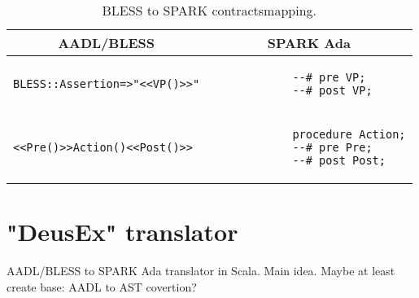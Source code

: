 \begin{table}[!ht]
	\caption{BLESS to SPARK contractsmapping.}
	\centering
  	\begin{tabular}{ | p{3in} | p{3in} |}

		\hline
		\multicolumn{1}{|c|}{\textbf{AADL/BLESS}} & \multicolumn{1}{|c|}{\textbf{SPARK Ada}} \\ \hline

		\begin{lstlisting}[language=bless]
			BLESS::Assertion=>"<<VP()>>"
		\end{lstlisting} 
		& 
		\begin{lstlisting}
			--# pre VP;
			--# post VP; 
		\end{lstlisting} 

		\\ \hline

		\begin{lstlisting}[language=bless]
			<<Pre()>>Action()<<Post()>>
		\end{lstlisting} 
		& 
		\begin{lstlisting}
			procedure Action;
			--# pre Pre;
			--# post Post;
		\end{lstlisting} 

		\\ \hline
	\end{tabular}
\end{table}

\section{"DeusEx" translator}
\label{codegen:translator}
AADL/BLESS to SPARK Ada translator in Scala. Main idea.
Maybe at least create base: AADL to AST covertion?

